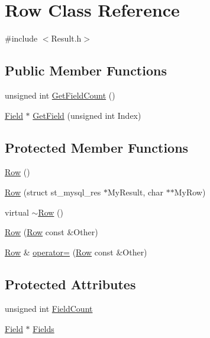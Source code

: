 \hypertarget{class_row}{}\section{Row Class Reference}
\label{class_row}


{\ttfamily \#include $<$Result.\+h$>$}

\subsection*{Public Member Functions}
\begin{DoxyCompactItemize}
\item 
unsigned int \hyperlink{class_row_a350878bd7c71889d2e532231b9d9da24}{Get\+Field\+Count} ()
\item 
\hyperlink{class_field}{Field} $\ast$ \hyperlink{class_row_a730f5847a857b319d9b373a7a6ed82a0}{Get\+Field} (unsigned int Index)
\end{DoxyCompactItemize}
\subsection*{Protected Member Functions}
\begin{DoxyCompactItemize}
\item 
\hyperlink{class_row_a5cca50abc389396e26ec68cbd3fb6596}{Row} ()
\item 
\hyperlink{class_row_ad58cd118e1b179f9e2f623ee2f0f69e5}{Row} (struct st\+\_\+mysql\+\_\+res $\ast$My\+Result, char $\ast$$\ast$My\+Row)
\item 
virtual \hyperlink{class_row_a8cc0869c91dc94ee595069309ba15690}{$\sim$\+Row} ()
\item 
\hyperlink{class_row_a755d8df726c1c60fdd13b9bad0eed2bc}{Row} (\hyperlink{class_row}{Row} const \&Other)
\item 
\hyperlink{class_row}{Row} \& \hyperlink{class_row_af707c3826bcf446fe94b82397cd063d9}{operator=} (\hyperlink{class_row}{Row} const \&Other)
\end{DoxyCompactItemize}
\subsection*{Protected Attributes}
\begin{DoxyCompactItemize}
\item 
unsigned int \hyperlink{class_row_a303b42c6d6097886d385c30596c7e6ee}{Field\+Count}
\item 
\hyperlink{class_field}{Field} $\ast$ \hyperlink{class_row_aaf5629269051fae24fbe8a4063d4375b}{Fields}
\end{DoxyCompactItemize}
